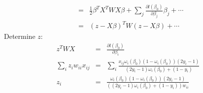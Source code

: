 \documentclass{article}
\begin{document}
\begin{enumerate}
\begin{enumerate}[A]
\begin{eqnarray}
&=&\frac{1}{2}\beta^TX^TWX\beta+\sum_j\frac{\partial l(\beta_0)}{\partial\beta_j}\beta_j+\cdots\nonumber\\
&=&(z-X\beta)^TW(z-X\beta)+\cdots
\end{eqnarray}
Determine $z$:
\begin{eqnarray}
z^TWX&=&\frac{\partial l(\beta_0)}{\partial\beta_i}\nonumber\\
\sum_iz_iw_{ii}x_{ij}&=&\sum_i\frac{x_{ij}\omega_i(\beta_0)(1-\omega_i(\beta_0))(2y_i-1)}{(2y_i-1)\omega_i(\beta_0)+(1-y_i)}\nonumber\\
z_i&=&\frac{\omega_i(\beta_0)(1-\omega_i(\beta_0))(2y_i-1)}{((2y_i-1)\omega_i(\beta_0)+(1-y_i))w_{ii}}
\end{eqnarray}
\end{enumerate}
\end{enumerate}
\end{document}
